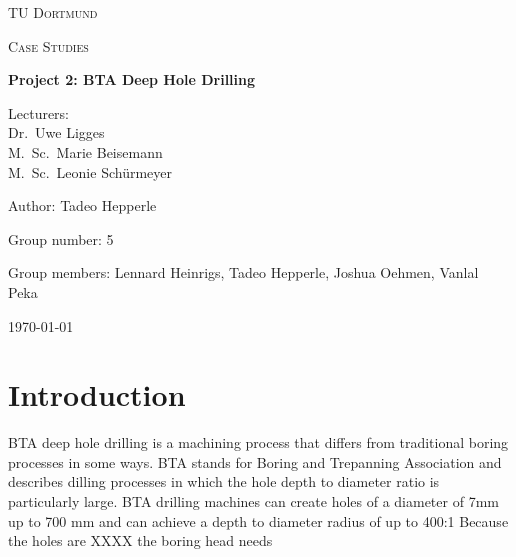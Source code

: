 \documentclass[12 pt]{scrartcl}
\begin{document}
\begin{titlepage}
  \centering
  {\scshape\LARGE TU Dortmund \par}
  \vspace{1cm}
  {\scshape\Large Case Studies \par}
  \vspace{2cm}
  {\huge\bfseries Project 2: BTA Deep Hole Drilling\par}
  \vspace{2cm}
  {\Large Lecturers:\\
    Dr.\ Uwe Ligges \\
    M.\ Sc.\ Marie Beisemann\\
    M.\ Sc.\ Leonie Schürmeyer \par}
  \vspace{1cm}
  {\Large Author: Tadeo Hepperle \par}
  \vspace{0.5 cm}
  {\Large Group number: 5\par}
  \vspace{0.5 cm}
  {\Large Group members: Lennard Heinrigs, Tadeo Hepperle, Joshua Oehmen, Vanlal Peka}
  \vfill
  {\large \today\par}
\end{titlepage}

\tableofcontents

\cleardoublepage

\section{Introduction}


BTA deep hole drilling is a machining process that differs from traditional boring processes in some ways.
BTA stands for Boring and Trepanning Association and describes dilling processes in which the hole depth to diameter ratio is particularly large. BTA drilling machines can create holes of a diameter of 7mm up to 700 mm and can achieve a depth to diameter radius of up to 400:1
Because the holes are XXXX the boring head needs




\end{document}
